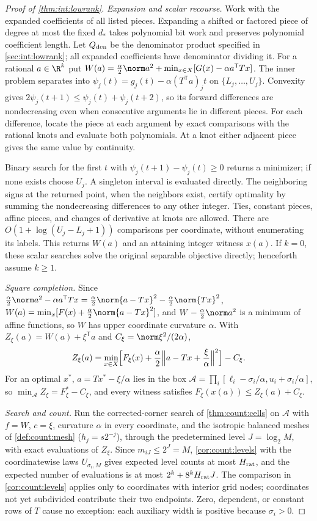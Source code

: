 \begin{proof}[Proof of \cref{thm:int:lowrank}]
\emph{Expansion and scalar recourse.} Work with the expanded coefficients
of all listed pieces. Expanding a shifted or factored piece of degree at
most the fixed $d_*$ takes polynomial bit work and preserves polynomial
coefficient length. Let $Q_{\rm den}$ be the denominator product specified
in \cref{sec:int:lowrank}; all expanded coefficients have denominator
dividing it. For a rational $a\in\R^k$ put
$W(a)=\frac\alpha2\norm a^2+\min_{x\in X}[G(x)-\alpha a^{\mathsf T}Tx]$.
The inner problem separates into
$\psi_j(t)=g_j(t)-\alpha(T^{\mathsf T}a)_jt$ on
$\{L_j,\ldots,U_j\}$. Convexity gives
$2\psi_j(t+1)\le\psi_j(t)+\psi_j(t+2)$, so its forward differences are
nondecreasing even when consecutive arguments lie in different pieces.
For each difference, locate the piece at each argument by exact comparisons
with the rational knots and evaluate both polynomials. At a knot either
adjacent piece gives the same value by continuity.

Binary search for the first $t$ with
$\psi_j(t+1)-\psi_j(t)\ge0$ returns a minimizer; if none exists choose
$U_j$. A singleton interval is evaluated directly. The neighboring signs
at the returned point, when the neighbors exist, certify optimality by
summing the nondecreasing differences to any other integer. Ties,
constant pieces, affine pieces, and changes of derivative at knots are
allowed. There are $O(1+\log(U_j-L_j+1))$ comparisons per coordinate,
without enumerating its labels. This returns $W(a)$ and an attaining
integer witness $x(a)$. If $k=0$, these scalar searches solve the original
separable objective directly; henceforth assume $k\ge1$.

\emph{Square completion.} Since $\frac\alpha2\norm a^2-\alpha a^{\mathsf T}Tx
=\frac\alpha2\norm{a-Tx}^2-\frac\alpha2\norm{Tx}^2$, $W(a)=\min_x[F(x)+\frac\alpha2
\norm{a-Tx}^2]$, and $W-\frac\alpha2\norm a^2$ is a minimum of affine functions, so $W$
has upper coordinate curvature $\alpha$. With $Z_\xi(a)=W(a)+\xi^{\mathsf T}a$ and
$C_\xi=\norm\xi^2/(2\alpha)$,
\[
 Z_\xi(a)=\min_{x\in X}\Bigl[F_\xi(x)+\frac\alpha2\Bigl\lVert a-Tx+\frac\xi\alpha\Bigr\rVert^2\Bigr]-C_\xi .
\]
For an optimal $x^*$, $a=Tx^*-\xi/\alpha$ lies in the box
$\mathcal A=\prod_i[\ell_i-\sigma_i/\alpha,u_i+\sigma_i/\alpha]$, so
$\min_{\mathcal A}Z_\xi=F_\xi^*-C_\xi$, and every witness satisfies
$F_\xi(x(a))\le Z_\xi(a)+C_\xi$.

\emph{Search and count.} Run the corrected-corner search of \cref{thm:count:cells} on
$\mathcal A$ with $f=W$, $c=\xi$, curvature $\alpha$ in every coordinate, and the
isotropic balanced meshes of \cref{def:count:mesh} ($h_j=s2^{-j}$), through the
predetermined level $J=\log_2M$, with exact evaluations of $Z_\xi$. Since $m_{iJ}\le2^J=M$,
\cref{cor:count:levels} with the coordinatewise laws $U_{\sigma_i,M}$ gives expected
level counts at most $H_{\rm rat}$, and the expected number of evaluations is at most
$2^k+8^kH_{\rm rat}J$. The comparison in
\cref{cor:count:levels} applies only to coordinates with interior grid
nodes; coordinates not yet subdivided contribute their two endpoints.
Zero, dependent, or constant rows of $T$ cause no exception: each auxiliary
width is positive because $\sigma_i>0$.


\end{proof}
